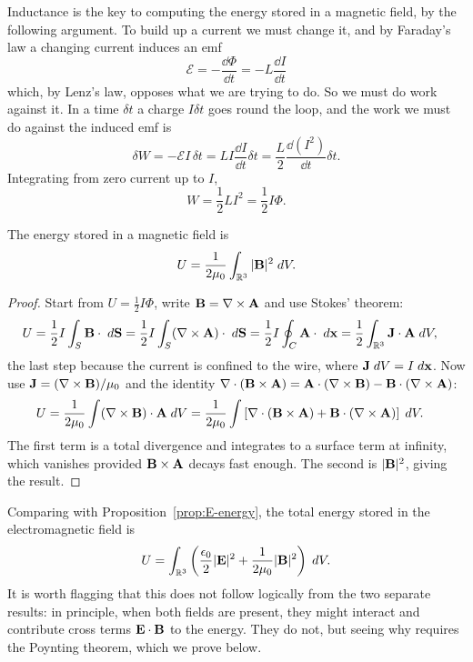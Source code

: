 \documentclass[a4paper]{scrartcl}
\begin{document}
Inductance is the key to computing the energy stored in a magnetic field, by the following argument. To build up a current we must change it, and by Faraday's law a changing current induces an emf
$$
\mathcal{E} = -\frac{\dd \Phi}{\dd t} = -L\frac{\dd I}{\dd t}
$$
which, by Lenz's law, opposes what we are trying to do. So we must do work against it. In a time $\delta t$ a charge $I\delta t$ goes round the loop, and the work we must do against the induced emf is
$$
\delta W = -\mathcal{E} I\, \delta t = LI \frac{\dd I}{\dd t}\delta t = \frac{L}{2}\frac{\dd (I^2)}{\dd t}\delta t.
$$
Integrating from zero current up to $I$,
$$
W = \frac{1}{2}LI^2 = \frac{1}{2}I\Phi.
$$

\begin{proposition}
	\label{prop:B-energy}
	The energy stored in a magnetic field is
	$$
	U = \frac{1}{2\mu_0}\int_{\mathbb{R}^3}|\mathbf{B}|^2 \; d V.
	$$
\end{proposition}
\begin{proof}
	Start from $U = \tfrac12 I \Phi$, write $\mathbf{B} = \nabla\times\mathbf{A}$ and use Stokes' theorem:
	\begin{align*}
		U &= \frac{1}{2}I\int_S \mathbf{B}\cdot \; d \mathbf{S} = \frac{1}{2}I\int_S (\nabla\times \mathbf{A})\cdot \; d \mathbf{S} = \frac{1}{2}I\oint_C \mathbf{A}\cdot\; d\mathbf{x} = \frac{1}{2}\int_{\mathbb{R}^3}\mathbf{J}\cdot \mathbf{A}\; d V,
	\end{align*}
	the last step because the current is confined to the wire, where $\mathbf{J}\; d V = I \; d \mathbf{x}$. Now use $\mathbf{J} = (\nabla\times\mathbf{B})/\mu_0$ and the identity $\nabla\cdot(\mathbf{B}\times\mathbf{A}) = \mathbf{A}\cdot(\nabla\times\mathbf{B}) - \mathbf{B}\cdot(\nabla\times\mathbf{A})$:
	\begin{align*}
		U &= \frac{1}{2\mu_0}\int (\nabla\times \mathbf{B})\cdot \mathbf{A}\; d V = \frac{1}{2\mu_0}\int\left[\nabla\cdot(\mathbf{B}\times\mathbf{A}) + \mathbf{B}\cdot(\nabla\times\mathbf{A})\right]\; d V.
	\end{align*}
	The first term is a total divergence and integrates to a surface term at infinity, which vanishes provided $\mathbf{B}\times\mathbf{A}$ decays fast enough. The second is $|\mathbf{B}|^2$, giving the result.
\end{proof}

Comparing with Proposition~\ref{prop:E-energy}, the total energy stored in the electromagnetic field is
$$
U = \int_{\mathbb{R}^3}\left(\frac{\epsilon_0}{2}|\mathbf{E}|^2 + \frac{1}{2\mu_0}|\mathbf{B}|^2\right)\; d V.
$$
It is worth flagging that this does not follow logically from the two separate results: in principle, when both fields are present, they might interact and contribute cross terms $\mathbf{E}\cdot\mathbf{B}$ to the energy. They do not, but seeing why requires the Poynting theorem, which we prove below.
\end{document}
